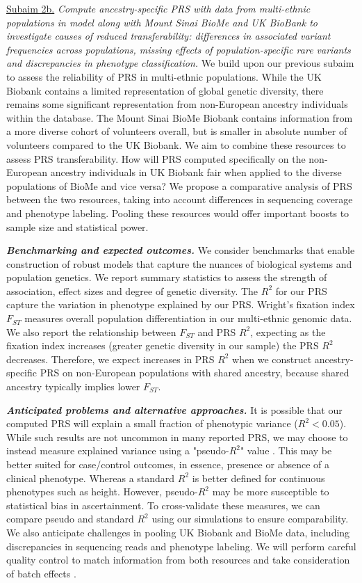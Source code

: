 \documentclass[11pt]{article}  %
\newlength\tindent
\renewcommand{\indent}{\hspace*{\tindent}}
\begin{document}
\indent \underline{Subaim 2b.} \textit{Compute ancestry-specific PRS with data from multi-ethnic populations in model along with Mount Sinai BioMe and UK BioBank to investigate causes of reduced transferability: differences in associated variant frequencies across populations, missing effects of population-specific rare variants and discrepancies in phenotype classification.} We build upon our previous subaim to assess the reliability of PRS in multi-ethnic populations. While the UK Biobank contains a limited representation of global genetic diversity, there remains some significant representation from non-European ancestry individuals within the database. The Mount Sinai BioMe Biobank contains information from a more diverse cohort of volunteers overall, but is smaller in absolute number of volunteers compared to the UK Biobank. We aim to combine these resources to assess PRS transferability. How will PRS computed specifically on the non-European ancestry individuals in UK Biobank fair when applied to the diverse populations of BioMe and vice versa? We propose a comparative analysis of PRS between the two resources, taking into account differences in sequencing coverage and phenotype labeling. Pooling these resources would offer important boosts to sample size and statistical power. 

\indent \textbf{\textit{Benchmarking and expected outcomes.}} We consider benchmarks that enable construction of robust models that capture the nuances of biological systems and population genetics. We report summary statistics to assess the strength of association, effect sizes and degree of genetic diversity. The $R^2$ for our PRS capture the variation in phenotype explained by our PRS. Wright's fixation index $F_{ST}$ \cite{wright_differential_1945} measures overall population differentiation in our multi-ethnic genomic data. We also report the relationship between $F_{ST}$ and PRS $R^2$, expecting as the fixation index increases (greater genetic diversity in our sample) the PRS $R^2$ decreases. Therefore, we expect increases in PRS $R^2$ when we construct ancestry-specific PRS on non-European populations with shared ancestry, because shared ancestry typically implies lower $F_{ST}$.         

\indent \textbf{\textit{Anticipated problems and alternative approaches.}} It is possible that our computed PRS will explain a small fraction of phenotypic variance ($R^2 < 0.05$). While such results are not uncommon in many reported PRS, we may choose to instead measure explained variance using a "pseudo-$R^2$" value \cite{choi_tutorial_2020}. This may be better suited for case/control outcomes, in essence, presence or absence of a clinical phenotype. Whereas a standard $R^2$ is better defined for continuous phenotypes such as height. However, pseudo-$R^2$ may be more susceptible to statistical bias in ascertainment. To cross-validate these measures, we can compare pseudo and standard $R^2$ using our simulations to ensure comparability. We also anticipate challenges in pooling UK Biobank and BioMe data, including discrepancies in sequencing reads and phenotype labeling. We will perform careful quality control to match information from both resources and take consideration of batch effects \cite{gilad_reanalysis_2015}.  
\end{document}
